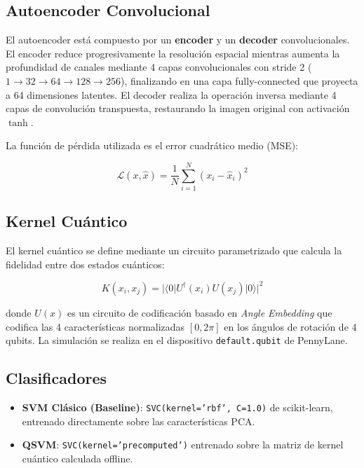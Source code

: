 \documentclass[conference]{IEEEtran}
\begin{document}
\subsection{Autoencoder Convolucional}

El autoencoder está compuesto por un \textbf{encoder} y un \textbf{decoder} 
convolucionales. El encoder reduce progresivamente la resolución espacial 
mientras aumenta la profundidad de canales mediante 4 capas convolucionales 
con stride 2 ($1 \to 32 \to 64 \to 128 \to 256$), finalizando en una capa 
fully-connected que proyecta a 64 dimensiones latentes. El decoder realiza 
la operación inversa mediante 4 capas de convolución transpuesta, restaurando 
la imagen original con activación $\tanh$.

La función de pérdida utilizada es el error cuadrático medio (MSE):

\begin{equation}
    \mathcal{L}(x, \hat{x}) = \frac{1}{N} \sum_{i=1}^{N} (x_i - \hat{x}_i)^2
    \label{eq:mse}
\end{equation}

\subsection{Kernel Cuántico}

El kernel cuántico se define mediante un circuito parametrizado que calcula la 
fidelidad entre dos estados cuánticos:

\begin{equation}
    K(x_i, x_j) = |\langle 0| U^\dagger(x_i) U(x_j) |0\rangle|^2
    \label{eq:kernel}
\end{equation}

donde $U(x)$ es un circuito de codificación basado en \textit{Angle Embedding} 
que codifica las 4 características normalizadas $[0, 2\pi]$ en los ángulos de 
rotación de 4 qubits. La simulación se realiza en el dispositivo 
\texttt{default.qubit} de PennyLane.

\subsection{Clasificadores}

\begin{itemize}
    \item \textbf{SVM Clásico (Baseline)}: \texttt{SVC(kernel='rbf', C=1.0)} 
          de scikit-learn, entrenado directamente sobre las características PCA.
    \item \textbf{QSVM}: \texttt{SVC(kernel='precomputed')} entrenado sobre la 
          matriz de kernel cuántico calculada offline.
\end{itemize}
\end{document}
